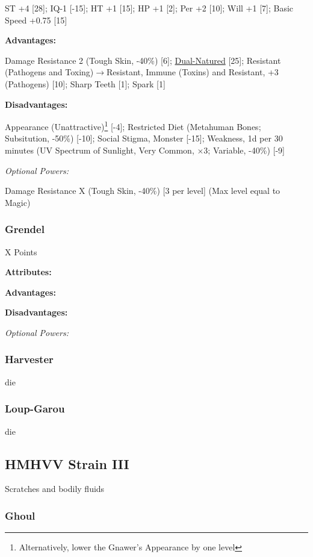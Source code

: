 \begin{multicols*}{3}
	ST +4 [28]; IQ-1 [-15]; HT +1 [15]; HP +1 [2]; Per +2 [10]; Will +1 [7]; Basic Speed +0.75 [15]
	
	\textbf{Advantages:}
	
	Damage Resistance 2 (Tough Skin, -40\%) [6]; \hyperref[dual_natured]{Dual-Natured} [25]; Resistant (Pathogens and Toxing)$\rightarrow$Resistant, Immune (Toxins)  and Resistant, +3 (Pathogens) [10]; Sharp Teeth [1]; Spark [1]
	
	\textbf{Disadvantages:}
	
	Appearance (Unattractive)\footnote{Alternatively, lower the Gnawer's Appearance by one level} [-4]; Restricted Diet (Metahuman Bones; Subsitution, -50\%) [-10]; Social Stigma, Monster [-15]; Weakness, 1d per 30 minutes (UV Spectrum of Sunlight, Very Common, $\times$3; Variable, -40\%) [-9]
	
	\textit{Optional Powers:}
	
	Damage Resistance X (Tough Skin, -40\%) [3 per level] (Max level equal to Magic)
	
	\subsubsection{Grendel}\label{grendel}
	\begin{flushright}
		X Points
	\end{flushright}
	
	\textbf{Attributes:}
	
	\textbf{Advantages:}
	
	\textbf{Disadvantages:}
	
	\textit{Optional Powers:}
	
	\subsubsection{Harvester}\label{harvester}
	die
	
	\subsubsection{Loup-Garou}\label{loup-garou}
	die
	
	\subsection*{HMHVV Strain III}
	
	Scratches and bodily fluids
	
	\subsubsection{Ghoul}\label{ghoul}
	

\end{multicols*}
